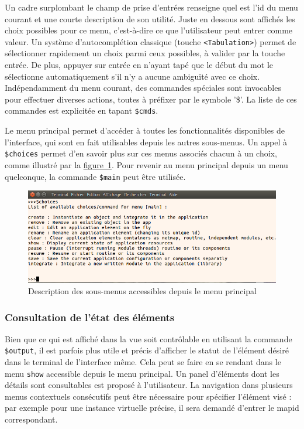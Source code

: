 \documentclass[]{article}
\newcommand{\wordlink}[2]{\hyperref[#1]{#2~\ref{#1}}}
\begin{document}
Un cadre surplombant le champ de prise d'entrées renseigne quel est l'id du menu courant et une courte description de son utilité. Juste en dessous sont affichés les choix possibles pour ce menu, c'est-à-dire ce que l'utilisateur peut entrer comme valeur. Un système d'autocomplétion classique (touche \texttt{<Tabulation>}) permet de sélectionner rapidement un choix parmi ceux possibles, à valider par la touche entrée. De plus, appuyer sur entrée en n'ayant tapé que le début du mot le sélectionne automatiquement s'il n'y a aucune ambiguïté avec ce choix. Indépendamment du menu courant, des commandes spéciales sont invocables pour effectuer diverses actions, toutes à préfixer par le symbole '\$'. La liste de ces commandes est explicitée en tapant \texttt{\$cmds}.\\

\par Le menu principal permet d'accéder à toutes les fonctionnalités disponibles de l'interface, qui sont en fait utilisables depuis les autres sous-menus. Un appel à \texttt{\$choices} permet d'en savoir plus sur ces menus associés chacun à un choix, comme illustré par la \wordlink{choicesmain}{figure}. Pour revenir au menu principal depuis un menu quelconque, la commande \texttt{\$main} peut être utilisée.

\begin{figure}[!ht]
\centering
     \includegraphics[width=0.65\linewidth]{choicesmain}
     \caption{Description des sous-menus accessibles depuis le menu principal}
     \label{choicesmain}
\end{figure}

\subsubsection{Consultation de l'état des éléments}

Bien que ce qui est affiché dans la vue soit contrôlable en utilisant la commande \texttt{\$output}, il est parfois plus utile et précis d'afficher le statut de l'élément désiré dans le terminal de l'interface même. Cela peut se faire en se rendant dans le menu \texttt{show} accessible depuis le menu principal. Un panel d'éléments dont les détails sont consultables est proposé à l'utilisateur. La navigation dans plusieurs menus contextuels consécutifs peut être nécessaire pour spécifier l'élément visé : par exemple pour une instance virtuelle précise, il sera demandé d'entrer le mapid correspondant.\\
\end{document}
